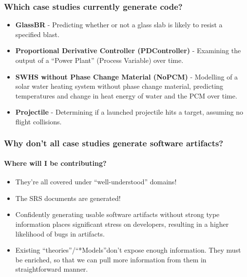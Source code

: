 \documentclass{beamer}
\begin{document}
\begin{frame}
    \frametitle{Which case studies currently generate code?}

    \begin{itemize}
        \item<1-> \textbf{GlassBR} - Predicting whether or not a glass slab is likely to resist a specified blast.
        \item<2-> \textbf{Proportional Derivative Controller (PDController)} - Examining the output of a ``Power Plant'' (Process Variable) over time.
        \item<3-> \textbf{SWHS without Phase Change Material (NoPCM)} - Modelling of a solar water heating system without phase change material, predicting temperatures and change in heat energy of water and the PCM over time.
        \item<4-> \textbf{Projectile} - Determining if a launched projectile hits a target, assuming no flight collisions.
    \end{itemize}
\end{frame}

\begin{frame}
    \frametitle{Why don't all case studies generate software artifacts?}
    \framesubtitle{Where will I be contributing?}

    \begin{itemize}
        \item<3-> They're all covered under ``well-understood'' domains!
        \item<4-> The SRS documents are generated!\\
    \end{itemize}


    \begin{itemize}
        \item<7-> Confidently generating usable software artifacts without strong type information places significant stress on developers, resulting in a higher likelihood of bugs in artifacts.
        \item<8-> Existing ``theories''/``*Models''\footnotemark[1] don't expose enough information. They must be enriched, so that we can pull more information from them in straightforward manner.
    \end{itemize}

\end{frame}
\end{document}
